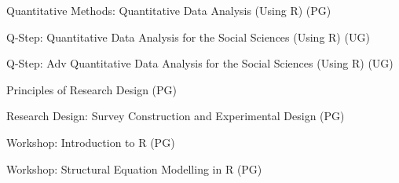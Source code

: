\documentclass[12pt]{article}
\newcommand{\halfblankline}{\quad\vspace{-0.5\baselineskip}\pagebreak[3]}
\begin{document}
\begin{innerlist}
        \item[] Quantitative Methods: Quantitative Data Analysis (Using R) (PG)
    	        	\begin{innerlist}
        		    	\item[] [SP09, SP10, SP11, SP12, SP13, SP14, AU17, AU18, AU19, AU20, AU21, AU22]
        		    \end{innerlist}
    	\item[] Q-Step: Quantitative Data Analysis for the Social Sciences (Using R) (UG)
    	        	\begin{innerlist}
        		    	\item[] [AU15, AU16, AU17, AU18, AU19, AU20]
        		    \end{innerlist}
        \item[] Q-Step: Adv Quantitative Data Analysis for the Social Sciences (Using R)  (UG)
    	        	\begin{innerlist}
        		    	\item[] [AU16 - 50\%]
        		    \end{innerlist}
        \item[] Principles of Research Design (PG)
        		    \begin{innerlist}
        		    	\item[] [AU09, AU13, SP19, SP20, SP21]
        		    \end{innerlist}
        \item[] Research Design: Survey Construction and Experimental Design (PG)
    	        	\begin{innerlist}
        		    	\item[] [SU10, AU11]
        		    \end{innerlist}
        \item[] Workshop: Introduction to R (PG)
    	        	\begin{innerlist}
        		    	\item[] [AU18, SP19, AU20]
        		    \end{innerlist}		
        \item[] Workshop: Structural Equation Modelling in R (PG)
    	        	\begin{innerlist}
        		    	\item[] [SP17, SP21]
        		    \end{innerlist}			
    \end{innerlist}

\halfblankline
\end{document}
